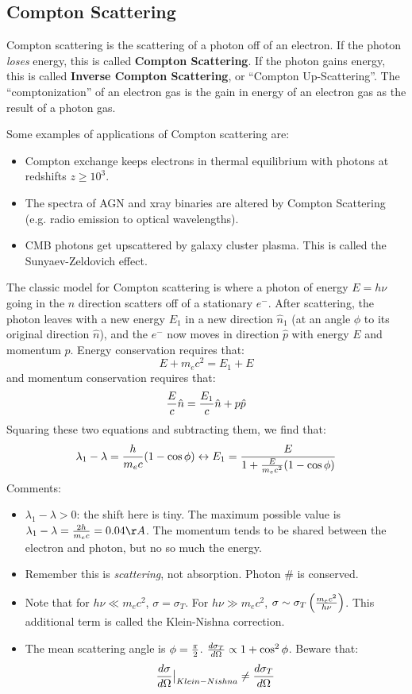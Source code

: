 \documentclass[11pt]{article}
\def\^{\hat}
\def\eval#1{\big|_{#1}}
\begin{document}
\subsection*{ Compton Scattering}

Compton scattering is the scattering of a photon off of an electron.  If
the photon {\it loses} energy, this is called {\bf Compton Scattering}.  If
the photon gains energy, this is called {\bf Inverse Compton Scattering}, or
``Compton Up-Scattering''.  The ``comptonization'' of an electron gas is the
gain in energy of an electron gas as the result of a photon gas.\par
Some examples of applications of Compton scattering are:
\begin{itemize}
\item  Compton exchange keeps electrons in thermal equilibrium with
photons at redshifts $z\ge10^3$.
\item  The spectra of AGN and xray binaries are altered by Compton
Scattering (e.g. radio emission to optical wavelengths).
\item  CMB photons get upscattered by galaxy cluster plasma.  This is
called the Sunyaev-Zeldovich effect.
\end{itemize}
The classic model for Compton scattering is where a photon of energy $E=h\nu$
going in the $\^n$ direction scatters off of a stationary $e^-$.  After
scattering, the photon leaves with a new energy $E_1$ in a new direction
$\^n_1$ (at an angle $\phi$ to its original direction $\^n$), and the $e^-$
now moves in direction $\^p$ with energy $E$ and momentum $p$.  Energy
conservation requires that:
$$E+m_ec^2=E_1+E$$
and momentum conservation requires that:
$${E\over c}\^n={E_1\over c}\^n+p\^p$$
Squaring these two equations and subtracting them, we find that:
$$\lambda_1-\lambda={h\over m_ec}(1-\cos\phi)\leftrightarrow
E_1={E\over1+{E\over m_ec^2}(1-\cos\phi)}$$
Comments:
\begin{itemize}
\item $\lambda_1-\lambda>0$: the shift here is tiny.  The maximum possible
value is $\lambda_1-\lambda={2h\over m_ec}=0.04\AA$.  The momentum
tends to be shared between the electron and photon, but no so much the energy.
\item  Remember this is {\it scattering}, not absorption.  Photon \# is
conserved.
\item  Note that for $h\nu\ll m_ec^2$, $\sigma=\sigma_T$.  For 
$h\nu\gg m_ec^2$, $\sigma\sim\sigma_T\left({m_ec^2\over h\nu}\right)$.  This
additional term is called the Klein-Nishna correction.
\item  The mean scattering angle is $\phi={\pi\over 2}$. 
${d\sigma_T\over d\Omega}\propto1+\cos^2\phi$.  Beware that:
$${d\sigma\over d\Omega}\eval{Klein-Nishna}\ne{d\sigma_T\over d\Omega}$$
\end{itemize}
\end{document}
